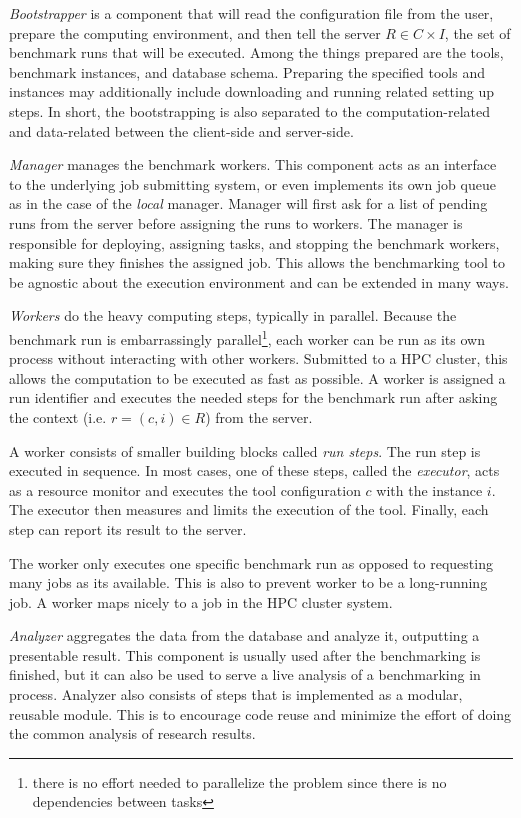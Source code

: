 \emph{Bootstrapper} is a component that will read the configuration file from the user, prepare the computing environment, and then tell the server $R \in C \times I$, the set of benchmark runs that will be executed.
Among the things prepared are the tools, benchmark instances, and database schema.
Preparing the specified tools and instances may additionally include downloading and running related setting up steps.
In short, the bootstrapping is also separated to the computation-related and data-related between the client-side and server-side.

\emph{Manager} manages the benchmark workers.
This component acts as an interface to the underlying job submitting system, or even implements its own job queue as in the case of the \emph{local} manager.
Manager will first ask for a list of pending runs from the server before assigning the runs to workers.
The manager is responsible for deploying, assigning tasks, and stopping the benchmark workers, making sure they finishes the assigned job.
This allows the benchmarking tool to be agnostic about the execution environment and can be extended in many ways.

\emph{Workers} do the heavy computing steps, typically in parallel.
Because the benchmark run is embarrassingly parallel\footnote{there is no effort needed to parallelize the problem since there is no dependencies between tasks}, each worker can be run as its own process without interacting with other workers.
Submitted to a HPC cluster, this allows the computation to be executed as fast as possible.
A worker is assigned a run identifier and executes the needed steps for the benchmark run after asking the context (i.e. $r = (c, i) \in R$) from the server.

A worker consists of smaller building blocks called \emph{run steps}.
The run step is executed in sequence.
In most cases, one of these steps, called the \emph{executor}, acts as a resource monitor and executes the tool configuration $c$ with the instance $i$.
The executor then measures and limits the execution of the tool.
Finally, each step can report its result to the server.

The worker only executes one specific benchmark run as opposed to requesting many jobs as its available.
This is also to prevent worker to be a long-running job.
A worker maps nicely to a job in the HPC cluster system.

\emph{Analyzer} aggregates the data from the database and analyze it, outputting a presentable result.
This component is usually used after the benchmarking is finished, but it can also be used to serve a live analysis of a benchmarking in process.
Analyzer also consists of steps that is implemented as a modular, reusable module.
This is to encourage code reuse and minimize the effort of doing the common analysis of research results.


